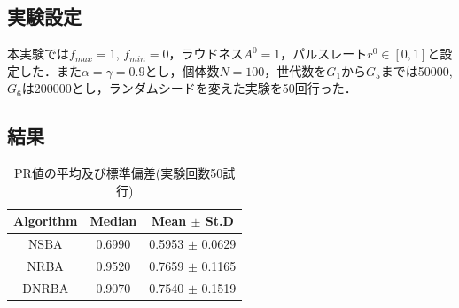 \documentclass[twocolumn, a4paper]{UECIEresume}
\begin{document}
\subsection{実験設定}
本実験では$f_{max}=1$, $f_{min}=0$，ラウドネス$A^0=1$，パルスレート$r^0 \in [0,1]$と設定した．また$\alpha= \gamma = 0.9$とし，個体数$N=100$，世代数を$G_1$から$G_5$までは50000, $G_6$は200000とし，ランダムシードを変えた実験を50回行った．

\subsection{結果}
\begin{table}[b]
\caption{PR値の平均及び標準偏差(実験回数50試行)}
\begin{center}
\begin{tabular}{c|c|c}
\hline

Algorithm & Median & Mean $\pm$ St.D  \\

\hline
NSBA & 0.6990 & 0.5953 $\pm$ 0.0629 \\
\hline
NRBA & 0.9520 & 0.7659 $\pm$ 0.1165 \\
\hline
DNRBA & 0.9070 & 0.7540 $\pm$ 0.1519 \\
\hline

\end{tabular}
\label{tab:MOP_results}
\end{center}
\end{table}
\end{document}
